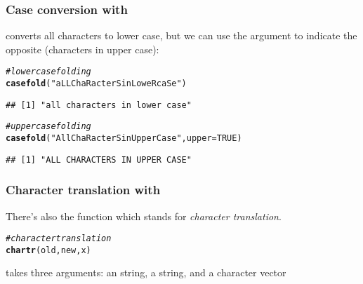 \documentclass[12pt]{beamer}\usepackage[]{graphicx}\usepackage[]{color}
\makeatletter
\newcommand{\hlnum}[1]{\textcolor[rgb]{0.686,0.059,0.569}{#1}}%
\newcommand{\hlstr}[1]{\textcolor[rgb]{0.192,0.494,0.8}{#1}}%
\newcommand{\hlcom}[1]{\textcolor[rgb]{0.678,0.584,0.686}{\textit{#1}}}%
\newcommand{\hlstd}[1]{\textcolor[rgb]{0.345,0.345,0.345}{#1}}%
\newcommand{\hlkwc}[1]{\textcolor[rgb]{0.333,0.667,0.333}{#1}}%
\newcommand{\hlkwd}[1]{\textcolor[rgb]{0.737,0.353,0.396}{\textbf{#1}}}%
\newenvironment{kframe}{%
 \def\at@end@of@kframe{}%
 \ifinner\ifhmode%
  \def\at@end@of@kframe{\end{minipage}}%
  \begin{minipage}{\columnwidth}%
 \fi\fi%
 \def\FrameCommand##1{\hskip\@totalleftmargin \hskip-\fboxsep
 \colorbox{shadecolor}{##1}\hskip-\fboxsep
     \hskip-\linewidth \hskip-\@totalleftmargin \hskip\columnwidth}%
 \MakeFramed {\advance\hsize-\width
   \@totalleftmargin\z@ \linewidth\hsize
   \@setminipage}}%
 {\par\unskip\endMakeFramed%
 \at@end@of@kframe}
\newenvironment{knitrout}{}{} %
\makeatother
\begin{document}
\begin{frame}[fragile]
\frametitle{Case conversion with }

 converts all characters to lower case, but we can use the argument  to indicate the opposite (characters in upper case):
\begin{knitrout}\footnotesize
{}\color{fgcolor}\begin{kframe}
\begin{alltt}
\hlcom{# lower case folding}
\hlkwd{casefold}\hlstd{(}\hlstr{"aLL ChaRacterS in LoweR caSe"}\hlstd{)}
\end{alltt}
\begin{verbatim}
## [1] "all characters in lower case"
\end{verbatim}
\begin{alltt}
\hlcom{# upper case folding}
\hlkwd{casefold}\hlstd{(}\hlstr{"All ChaRacterS in Upper Case"}\hlstd{,} \hlkwc{upper} \hlstd{=} \hlnum{TRUE}\hlstd{)}
\end{alltt}
\begin{verbatim}
## [1] "ALL CHARACTERS IN UPPER CASE"
\end{verbatim}
\end{kframe}
\end{knitrout}

\end{frame}


\begin{frame}[fragile]
\frametitle{Character translation with }

There's also the function  which stands for \textit{character translation}. 
\begin{knitrout}\footnotesize
{}\color{fgcolor}\begin{kframe}
\begin{alltt}
\hlcom{# character translation}
\hlkwd{chartr}\hlstd{(old, new, x)}
\end{alltt}
\end{kframe}
\end{knitrout}

 takes three arguments: an  string, a  string, and a character vector 

\end{frame}
\end{document}
